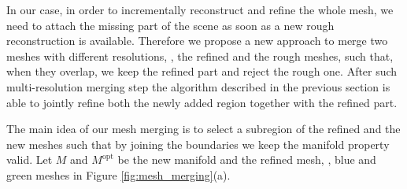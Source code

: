 In our case, in order to incrementally reconstruct and refine the whole mesh, we need to attach the missing part of the scene as soon as a new rough reconstruction is available. Therefore we propose a new approach to merge two meshes with  different resolutions, \ie, the refined and the rough meshes, such that, when they overlap, we  keep the refined part and reject the rough one.
After such multi-resolution merging step the algorithm described in the previous section is able to jointly refine both the newly added region together with the refined part.

The main idea of our mesh merging is to select a subregion of the refined and the new meshes such that by joining  the boundaries we keep the manifold property valid.
Let $\mathit{M}$ and  $\mathit{M}^{\text{opt}}$ be the new manifold and the refined mesh, \eg, blue and green meshes in Figure \ref{fig:mesh_merging}(a). 




